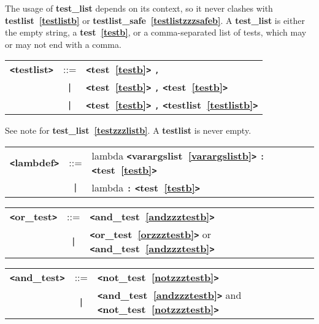 \documentclass[12pt]{article}
\begin{document}
The usage of {\bf test\_{}list} depends on its context, so it never clashes with {\bf testlist~\ref{testlistb}} or {\bf testlist\_{}safe~\ref{testlistzzzsafeb}}.  A {\bf test\_{}list} is either the empty string, a {\bf test~\ref{testb}}, or a comma-separated list of tests, which may or may not end with a comma.

\label{testlistb}
\begin{tabular}{lcl}
{\bf \verb+<+testlist\verb+>+} & ::=  & {\bf \verb+<+test~\ref{testb}\verb+>+}  \verb|,| \\
 & \verb+|+  & {\bf \verb+<+test~\ref{testb}\verb+>+}  \verb|,| {\bf \verb+<+test~\ref{testb}\verb+>+}  \\
 & \verb+|+  & {\bf \verb+<+test~\ref{testb}\verb+>+}  \verb|,| {\bf \verb+<+testlist~\ref{testlistb}\verb+>+}  \\
\end{tabular}

See note for {\bf test\_{}list~\ref{testzzzlistb}}.  A {\bf testlist} is never empty.

\label{lambdefb}
\begin{tabular}{lcl}
{\bf \verb+<+lambdef\verb+>+} & ::=  & lambda {\bf \verb+<+varargslist~\ref{varargslistb}\verb+>+}  \verb|:| {\bf \verb+<+test~\ref{testb}\verb+>+}  \\
 & \verb+|+  & lambda \verb|:| {\bf \verb+<+test~\ref{testb}\verb+>+}  \\
\end{tabular}

\label{orzzztestb}
\begin{tabular}{lcl}
{\bf \verb+<+or\_test\verb+>+} & ::=  & {\bf \verb+<+and\_test~\ref{andzzztestb}\verb+>+}  \\
 & \verb+|+  & {\bf \verb+<+or\_test~\ref{orzzztestb}\verb+>+}  or {\bf \verb+<+and\_test~\ref{andzzztestb}\verb+>+}  \\
\end{tabular}

\label{andzzztestb}
\begin{tabular}{lcl}
{\bf \verb+<+and\_test\verb+>+} & ::=  & {\bf \verb+<+not\_test~\ref{notzzztestb}\verb+>+}  \\
 & \verb+|+  & {\bf \verb+<+and\_test~\ref{andzzztestb}\verb+>+}  and {\bf \verb+<+not\_test~\ref{notzzztestb}\verb+>+}  \\
\end{tabular}
\end{document}
